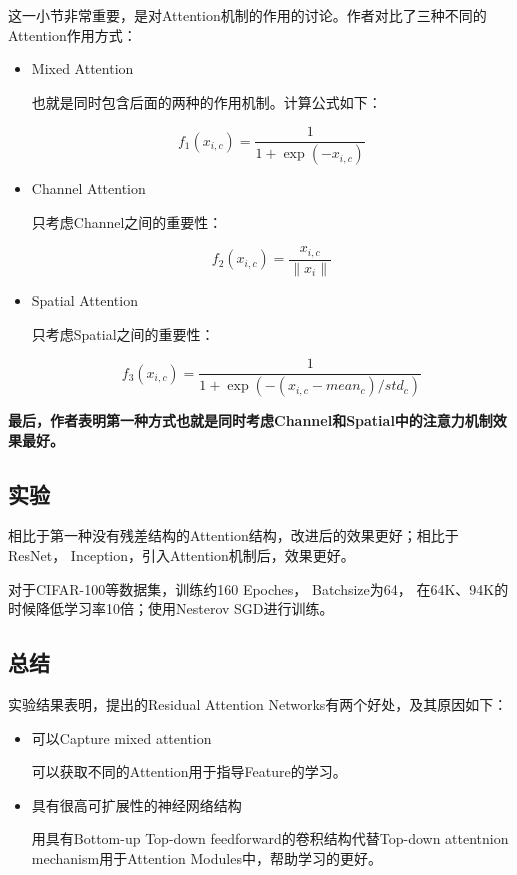 这一小节非常重要，是对Attention机制的作用的讨论。作者对比了三种不同的Attention作用方式：
\begin{itemize}
\item Mixed Attention

也就是同时包含后面的两种的作用机制。计算公式如下：

\begin{displaymath}
f_1(x_{i, c}) = \frac{1}{1 + \exp(-x_{i, c})}
\end{displaymath}

\item Channel Attention

只考虑Channel之间的重要性：

\begin{displaymath}
f_2(x_{i, c}) = \frac{x_{i, c}}{\parallel x_{i} \parallel}
\end{displaymath}

\item Spatial Attention

只考虑Spatial之间的重要性：

\begin{displaymath}
f_3(x_{i, c}) = \frac{1}{1 + \exp(-(x_{i, c} - mean_c)/std_c)}
\end{displaymath}
\end{itemize}

{\bfseries 最后，作者表明第一种方式也就是同时考虑Channel和Spatial中的注意力机制效果最好。}

\subsection{实验}

相比于第一种没有残差结构的Attention结构，改进后的效果更好；相比于ResNet， Inception，引入Attention机制后，效果更好。

对于CIFAR-100等数据集，训练约160 Epoches， Batchsize为64， 在64K、94K的时候降低学习率10倍；使用Nesterov SGD进行训练。

\subsection{总结}                         

实验结果表明，提出的Residual Attention Networks有两个好处，及其原因如下：

\begin{itemize}
\item 可以Capture mixed attention

可以获取不同的Attention用于指导Feature的学习。

\item 具有很高可扩展性的神经网络结构

用具有Bottom-up Top-down feedforward的卷积结构代替Top-down attentnion mechanism用于Attention Modules中，帮助学习的更好。

\end{itemize}

